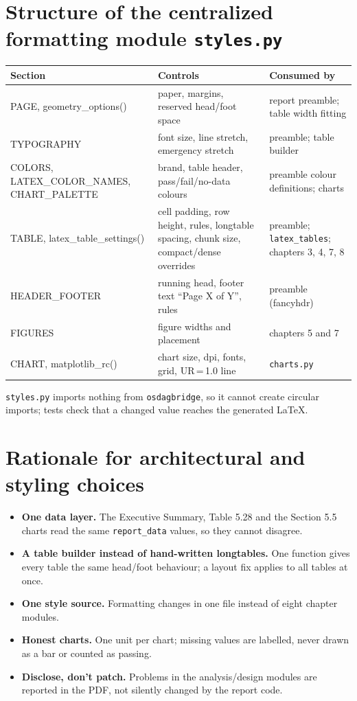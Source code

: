 \documentclass[10pt,a4paper]{article}
\newcommand{\f}[1]{\texttt{#1}}
\begin{document}
\section{Structure of the centralized formatting module \f{styles.py}}
\noindent\begin{tabular}{@{}>{\ttfamily\raggedright}p{4.5cm}>{\raggedright}p{6.0cm}>{\raggedright\arraybackslash}p{6.0cm}@{}}
\textrm{\textbf{Section}} & \textbf{Controls} & \textbf{Consumed by}\\ \hline
PAGE, geometry\_options() & paper, margins, reserved head/foot space & report preamble; table width fitting\\
TYPOGRAPHY & font size, line stretch, emergency stretch & preamble; table builder\\
COLORS, LATEX\_COLOR\_NAMES, CHART\_PALETTE & brand, table header, pass/fail/no-data colours & preamble colour definitions; charts\\
TABLE, latex\_table\_settings() & cell padding, row height, rules, longtable spacing, chunk size, compact/dense overrides & preamble; \f{latex\_tables}; chapters 3, 4, 7, 8\\
HEADER\_FOOTER & running head, footer text ``Page X of Y'', rules & preamble (fancyhdr)\\
FIGURES & figure widths and placement & chapters 5 and 7\\
CHART, matplotlib\_rc() & chart size, dpi, fonts, grid, UR\,=\,1.0 line & \f{charts.py}\\
\end{tabular}\par
\vspace{-4pt}
\f{styles.py} imports nothing from \f{osdagbridge}, so it cannot create circular imports; tests check that a changed value reaches the generated LaTeX.

\section{Rationale for architectural and styling choices}
\begin{itemize}
\item \textbf{One data layer.} The Executive Summary, Table 5.28 and the Section 5.5 charts read the same \f{report\_data} values, so they cannot disagree.
\item \textbf{A table builder instead of hand-written longtables.} One function gives every table the same head/foot behaviour; a layout fix applies to all tables at once.
\item \textbf{One style source.} Formatting changes in one file instead of eight chapter modules.
\item \textbf{Honest charts.} One unit per chart; missing values are labelled, never drawn as a bar or counted as passing.
\item \textbf{Disclose, don't patch.} Problems in the analysis/design modules are reported in the PDF, not silently changed by the report code.
\end{itemize}
\end{document}

